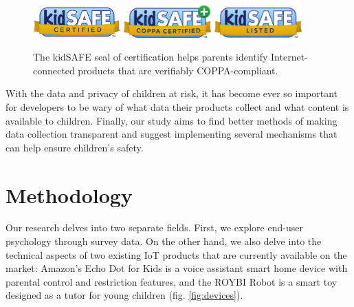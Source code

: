 \documentclass[12pt]{ucthesis}
\begin{document}
\begin{figure}
    \centering
    \includegraphics[width=0.3\textwidth]{kidsafe1.png}
    \includegraphics[width=0.3\textwidth]{kidsafe2.png}
    \includegraphics[width=0.3\textwidth]{kidsafe3.png}
    \caption{The kidSAFE seal of certification helps parents identify Internet-connected products that are verifiably COPPA-compliant.}
    \label{fig:kidsafe}
\end{figure}

With the data and privacy of children at risk, it has become ever so important for developers to be wary of what data their products collect and what content is available to children. Finally, our study aims to find better methods of making data collection transparent and suggest implementing several mechanisms that can help ensure children's safety. 

\chapter{Methodology}
\label{ch:methodology}
Our research delves into two separate fields. First, we explore end-user psychology through survey data. On the other hand, we also delve into the technical aspects of two existing IoT products that are currently available on the market: Amazon's Echo Dot for Kids is a voice assistant smart home device with parental control and restriction features, and the ROYBI Robot is a smart toy designed as a tutor for young children (fig. \ref{fig:devices}).
\end{document}
